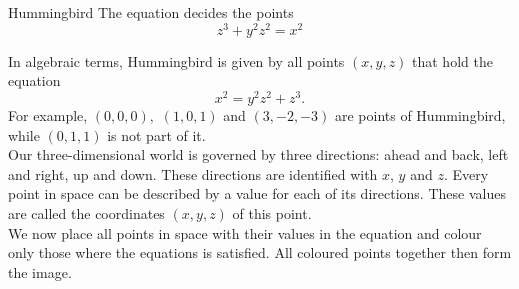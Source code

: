 \begin{surferPage}{Hummingbird}
The equation decides the points\\
  
  \smallskip
\[z^3+ y^2	z^2	= x^2\]

\singlespacing
In algebraic terms, Hummingbird is given by all points $(x, y, z)$ that hold the equation
\smallskip
\[ x^2= y^2z^2+z^3.\]
\smallskip
For example, $(0,0,0),$ $(1,0,1)$ and $(3,-2,-3)$ are points of Hummingbird, while $(0,1,1)$ is not part of it.\\
 \singlespacing
 Our three-dimensional world is governed by three directions: ahead and back, left and right, up and down. These directions are identified with $x$, $y$ and $z$. Every point in space can be described by a value for each of its directions. These values are called the coordinates $(x,y,z)$ of this point.\\
\singlespacing
We now place all points in space with their values in the equation and colour only those where the equations is satisfied. All coloured points together then form the image.
\end{surferPage}
